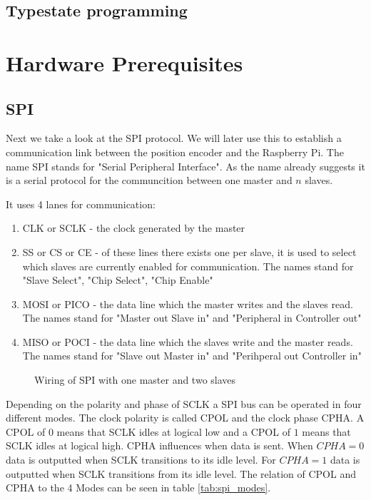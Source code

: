 \subsection{Typestate programming }

\section{Hardware Prerequisites}

\newpage
\subsection{SPI}
\label{sec:background:spi}
Next we take a look at the SPI protocol.
We will later use this to establish a communication link between the position encoder and the Raspberry Pi.
The name SPI stands for "Serial Peripheral Interface".
As the name already suggests it is a serial protocol for the communcition between one master and $n$ slaves.

It uses 4 lanes for communication\cite[p. 220]{SensornetzwerkeInTheorieUndPraxis}:

\begin{enumerate}
    \item CLK or SCLK - the clock generated by the master
    \item SS or CS or CE - of these lines there exists one per slave, it is used to select which slaves are currently enabled for communication. The names stand for "Slave Select", "Chip Select", "Chip Enable"
    \item MOSI or PICO - the data line which the master writes and the slaves read. The names stand for "Master out Slave in" and "Peripheral in Controller out"
    \item MISO or POCI - the data line which the slaves write and the master reads. The names stand for "Slave out Master in" and "Perihperal out Controller in"
\end{enumerate}

\begin{figure}[hp]
    \begin{center}
        
        \caption{Wiring of SPI with one master and two slaves}
        \label{fig:spi}
    \end{center}
\end{figure}

Depending on the polarity and phase of SCLK a SPI bus can be operated in four different modes.
The clock polarity is called CPOL and the clock phase CPHA.
A CPOL of $0$ means that SCLK idles at logical low and a CPOL of $1$ means that SCLK idles at logical high.
CPHA influences when data is sent.
When $CPHA = 0$ data is outputted when SCLK transitions to its idle level.
For $CPHA = 1$ data is outputted when SCLK transitions from its idle level.
The relation of CPOL and CPHA to the 4 Modes can be seen in table \ref{tab:spi_modes}.

